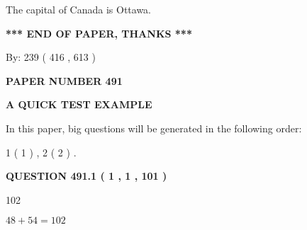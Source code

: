 \documentclass[12pt]{article}
\begin{document}
  
 
 
\noindent{}
 
 
The capital of Canada is Ottawa.
 
 
 
 
   
   
 \vspace{0.2in}
 
   
   
   
   
\vspace{1.0in} 
{\textbf{\large{ *** END OF PAPER, THANKS *** }}} 
   
   
\hspace{1.0in} By: 
 239 ( 416 ,  613 )
   
   
   
   
\newpage 
\setcounter{page}{ 
   491001 } 
   
   
   
   
 {\textbf{ \Large{ PAPER NUMBER  491  }}}
   
   
\vspace{0.2in}
   
   
   
   
   
   
 \vspace{0.2in}
{\LARGE {\textbf{ A QUICK TEST EXAMPLE}}}
   
   
   
\vspace{0.2in}
   
In this paper, big questions will be generated in the following order: 
   
   
   1 ( 1 )
 ,
   2 ( 2 )
 .
  
\vspace{0.2in}
  
{\textbf{\Large{QUESTION
491.1 
 ( 1 , 1 , 101 )
}}}
  
  
 
 
\noindent{}

102
 
 
 
 
\noindent{}

$ %
48 +  %
54=   %
102$
 
\end{document}
